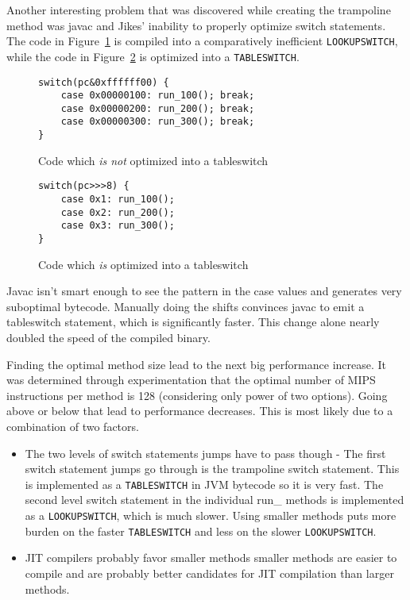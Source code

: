 \documentclass{acmconf}
\begin{document}
Another interesting problem that was discovered while creating the
trampoline method was javac and Jikes' inability to properly optimize
switch statements.  The code in Figure~\ref{lookupswitch} is compiled
into a comparatively inefficient {\tt LOOKUPSWITCH}, while the code in
Figure~\ref{tableswitch} is optimized into a {\tt TABLESWITCH}.

\begin{figure}
{\footnotesize\begin{verbatim}
switch(pc&0xffffff00) {
    case 0x00000100: run_100(); break;
    case 0x00000200: run_200(); break;
    case 0x00000300: run_300(); break;
}
\end{verbatim}}
\caption{\label{lookupswitch} Code which {\it is not} optimized into a tableswitch}
\end{figure}

\begin{figure}
{\footnotesize\begin{verbatim}
switch(pc>>>8) {
    case 0x1: run_100();
    case 0x2: run_200();
    case 0x3: run_300();
}
\end{verbatim}}
\caption{\label{tableswitch} Code which {\it is} optimized into a tableswitch}
\end{figure}

Javac isn't smart enough to see the pattern in the case values and
generates very suboptimal bytecode. Manually doing the shifts
convinces javac to emit a tableswitch statement, which is
significantly faster. This change alone nearly doubled the speed of
the compiled binary.

Finding the optimal method size lead to the next big performance
increase.  It was determined through experimentation that the optimal
number of MIPS instructions per method is 128 (considering only power
of two options). Going above or below that lead to performance
decreases. This is most likely due to a combination of two factors.

\begin{itemize}

\item The two levels of switch statements jumps have to pass though -
      The first switch statement jumps go through is the trampoline
      switch statement. This is implemented as a {\tt TABLESWITCH} in JVM
      bytecode so it is very fast. The second level switch statement
      in the individual run\_ methods is implemented as a
      {\tt LOOKUPSWITCH}, which is much slower. Using smaller methods puts
      more burden on the faster {\tt TABLESWITCH} and less on the slower
      {\tt LOOKUPSWITCH}.

\item JIT compilers probably favor smaller methods smaller methods are
      easier to compile and are probably better candidates for JIT
      compilation than larger methods.

\end{itemize}
\end{document}
